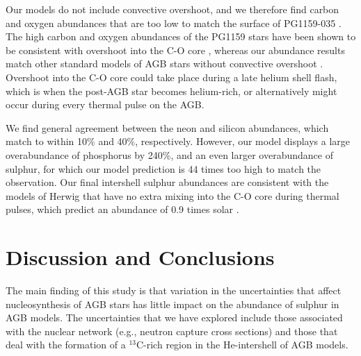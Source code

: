 Our models do not include convective overshoot, and we therefore find carbon and oxygen abundances that are too low to match the surface of PG1159-035 \citep{Werner:1991tn}. The high carbon and oxygen abundances of the PG1159 stars have been shown to be consistent with overshoot into the C-O core \citep{Herwig:1999uf}, whereas our abundance results match other standard models of AGB stars without convective overshoot \citep{Boothroyd:1988du,Karakas:2002ci}. Overshoot into the C-O core could take place during a late helium shell flash, which is when the post-AGB star becomes helium-rich, or alternatively might occur during every thermal pulse on the AGB.

We find general agreement between the neon and silicon abundances, which match to within 10\% and 40\%, respectively. However, our model displays a large overabundance of phosphorus by 240\%, and an even larger overabundance of sulphur, for which our model prediction is  44 times too high to match the observation. Our final intershell sulphur abundances are consistent with the models of Herwig that have no extra mixing into the C-O core during thermal pulses, which predict an abundance of 0.9 times solar \citep{Werner:2006bf}.

\section{Discussion and Conclusions}\label{sec:s13discussion}

The main finding of this study is that variation in the uncertainties
that affect nucleosynthesis of AGB stars  has little impact on the
abundance of sulphur in AGB models. The uncertainties that we have explored include 
those associated with the nuclear network (e.g., neutron capture
cross sections) and those that deal with the formation of a $^{13}$C-rich region in the He-intershell of AGB models.

